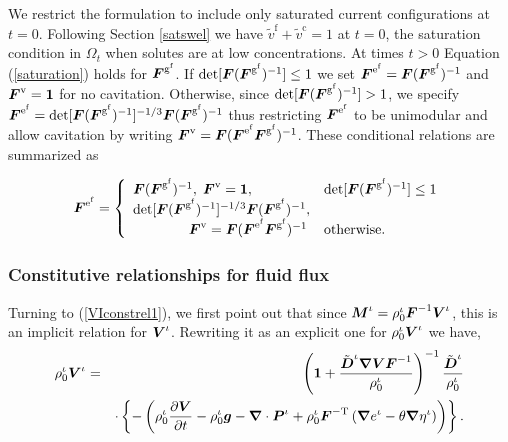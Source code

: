 We restrict the formulation to include only saturated current
configurations at $t = 0$. Following Section \ref{satswel} we have
$\tilde{v}^\mathrm{f} + \tilde{v}^\mathrm{c} = 1$ at $t = 0$, the saturation
condition in $\Omega_t$ when solutes are at low
concentrations. At times $t > 0$ Equation (\ref{saturation}) holds for
$\mbox{\boldmath$ F$}^{\mathrm{g}^\mathrm{f}}$. If
$\mathrm{det}[\mbox{\boldmath$ F$}(\mbox{\boldmath$ F$}^{\mathrm{g}^\mathrm{f}})^{-1}] \le 1$ we set
$\mbox{\boldmath$ F$}^{\mathrm{e}^\mathrm{f}} = \mbox{\boldmath$ F$}(\mbox{\boldmath$ F$}^{\mathrm{g}^\mathrm{f}})^{-1}$
and $\mbox{\boldmath$ F$}^{\mathrm{v}} = {\bf 1}$ for no cavitation. Otherwise, since
$\mathrm{det}[\mbox{\boldmath$ F$}(\mbox{\boldmath$ F$}^{\mathrm{g}^\mathrm{f}})^{-1}] > 1$, we specify
$\mbox{\boldmath$ F$}^{\mathrm{e}^\mathrm{f}} =
\mathrm{det}[\mbox{\boldmath$ F$}(\mbox{\boldmath$ F$}^{\mathrm{g}^\mathrm{f}})^{-1}]^{-1/3}\mbox{\boldmath$ F$}(\mbox{\boldmath$ F$}^{\mathrm{g}^\mathrm{f}})^{-1}$
thus restricting
$\mbox{\boldmath$ F$}^{\mathrm{e}^\mathrm{f}}$ to be unimodular and allow cavitation by
writing $\mbox{\boldmath$ F$}^{\mathrm{v}} = \mbox{\boldmath$ F$}(\mbox{\boldmath$ F$}^{\mathrm{e}^\mathrm{f}}\mbox{\boldmath$ F$}^{\mathrm{g}^\mathrm{f}})^{-1}$.
These conditional relations are summarized as 

\begin{equation}
\mbox{\boldmath$ F$}^{\mathrm{e}^\mathrm{f}} = \left\{ \begin{array}{ll}
  \mbox{\boldmath$ F$}(\mbox{\boldmath$ F$}^{\mathrm{g}^\mathrm{f}})^{-1},\; \mbox{\boldmath$ F$}^{\mathrm{v}} = {\bf 1},&
 \mathrm{det}[\mbox{\boldmath$ F$}(\mbox{\boldmath$ F$}^{\mathrm{g}^\mathrm{f}})^{-1}] \le 1\\
  \mathrm{det}[\mbox{\boldmath$ F$}(\mbox{\boldmath$ F$}^{\mathrm{g}^\mathrm{f}})^{-1}]^{-1/3}\mbox{\boldmath$ F$}(\mbox{\boldmath$ F$}^{\mathrm{g}^\mathrm{f}})^{-1},
  & \\
  \qquad\qquad \mbox{\boldmath$ F$}^{\mathrm{v}} = \mbox{\boldmath$ F$}(\mbox{\boldmath$ F$}^{\mathrm{e}^\mathrm{f}}\mbox{\boldmath$ F$}^{\mathrm{g}^\mathrm{f}})^{-1}
  & \mathrm{otherwise.}
\end{array}\right.
\label{cavitation}
\end{equation}

\subsubsection{Constitutive relationships for fluid flux}
\label{fluid-flux-constitutive-relationships}

Turning to (\ref{VIconstrel1}), we first point out that since
$\mbox{\boldmath$ M$}^\iota = \rho_0^\iota\mbox{\boldmath$ F$}^{-1}\mbox{\boldmath$ V$}^\iota$, this is an implicit
relation for $\mbox{\boldmath$ V$}^\iota$. Rewriting it as an explicit one for
$\rho^\iota_0\mbox{\boldmath$ V$}^\iota$ we have,
\begin{eqnarray}
\rho^\iota_0\mbox{\boldmath$ V$}^\iota =& &\left({\bf 1} +
\frac{\tilde{\mbox{\boldmath$ D$}}^\iota\mbox{\boldmath$\nabla$}\mbox{\boldmath$ V$}\mbox{\boldmath$ F$}^{-1}}{\rho^\iota_0}\right)^{-1}\frac{\tilde{\mbox{\boldmath$ D$}}^\iota}{\rho^\iota_0}\nonumber\\
& &\cdot\left\{-\left(\rho^\iota_0\frac{\partial\mbox{\boldmath$ V$}}{\partial t} -
\rho_0^\iota\mbox{\boldmath$ g$} - \mbox{\boldmath$\nabla$}\cdot\mbox{\boldmath$ P$}^\iota +
\rho^\iota_0\mbox{\boldmath$ F$}^{-\mathrm{T}}\left(\mbox{\boldmath$\nabla$} e^\iota -
\theta\mbox{\boldmath$\nabla$}\eta^\iota\right)\right)\right\}. \label{VIconstrel2}
\end{eqnarray}


